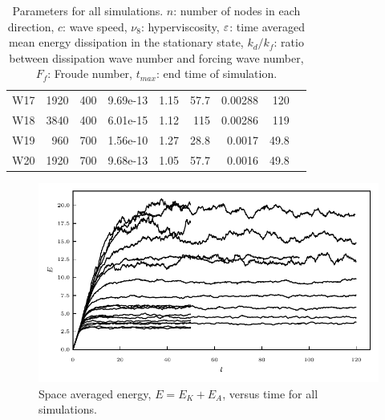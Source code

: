 \begin{table}
\begin{center}
\begin{tabular}{lrrrrrrrr}
W17 &  1920 &  400 & 9.69e-13 &        1.15 &                    57.7 & 0.00288 &                 120 \\
W18 &  3840 &  400 & 6.01e-15 &        1.12 &                     115 & 0.00286 &                119 \\
W19 &   960 &  700 & 1.56e-10 &        1.27 &                    28.8 &  0.0017 &                49.8 \\
W20 &  1920 &  700 & 9.68e-13 &        1.05 &                    57.7 &  0.0016 &                49.8 \\
\bottomrule

\end{tabular}
\caption{Parameters for all simulations. $ n $: number of nodes in each
direction, $ c $: wave speed, $ \nu_8 $: hyperviscosity, $ \varepsilon $: time
averaged mean energy dissipation in the stationary state, $ k_{d}/ k_f $: ratio
between dissipation wave number and forcing wave number, $ F_f $: Froude
number, $ t_{max} $: end time of simulation.}
\end{center}
\end{table}





\begin{figure}
\centerline{\includegraphics[width=5.12in]{../Pyfig/fig_Emean_time}}
\caption{Space averaged energy, $E = E_K + E_A $, versus time for all
simulations. }
\label{fig_Evstime}
\end{figure}

